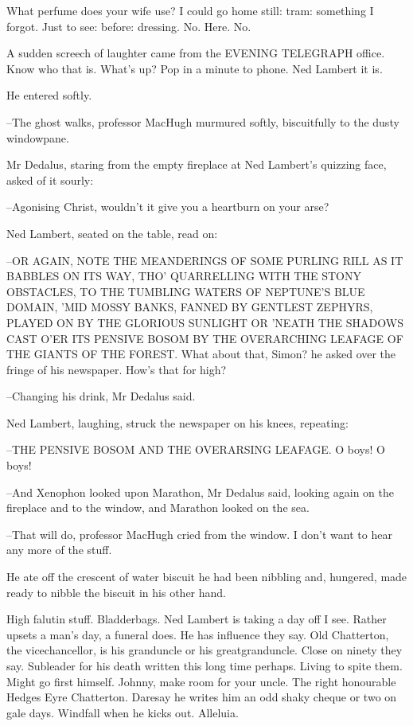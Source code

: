 What perfume does your wife use?
I could go home still:
tram: something I forgot.
Just to see: before:
dressing.
No.
Here.
No.

A sudden screech of laughter came from the EVENING TELEGRAPH office.
Know who that is.
What's up?
Pop in a minute to phone.
Ned Lambert it is.

He entered softly.



--The ghost walks,
professor MacHugh murmured softly, biscuitfully
to the dusty windowpane.

Mr Dedalus,
staring from the empty fireplace at Ned Lambert's quizzing face,
asked of it sourly:

--Agonising Christ,
wouldn't it give you a heartburn on your arse?

Ned Lambert, seated on the table, read on:

--OR AGAIN, NOTE THE MEANDERINGS OF SOME PURLING RILL
AS IT BABBLES ON ITS WAY,
THO' QUARRELLING WITH THE STONY OBSTACLES,
TO THE TUMBLING WATERS OF NEPTUNE'S BLUE DOMAIN,
'MID MOSSY BANKS,
FANNED BY GENTLEST ZEPHYRS,
PLAYED ON BY THE GLORIOUS SUNLIGHT
OR 'NEATH THE SHADOWS CAST O'ER ITS PENSIVE BOSOM
BY THE OVERARCHING LEAFAGE OF THE GIANTS OF THE FOREST.
What about that, Simon?
he asked over the fringe of his newspaper.
How's that for high?

--Changing his drink,
Mr Dedalus said.

Ned Lambert, laughing,
struck the newspaper on his knees,
repeating:

--THE PENSIVE BOSOM AND THE OVERARSING LEAFAGE.
O boys!
O boys!

--And Xenophon looked upon Marathon,
Mr Dedalus said,
looking again on the fireplace and to the window,
and Marathon looked on the sea.

--That will do,
professor MacHugh cried from the window.
I don't want to hear any more of the stuff.

He ate off the crescent of water biscuit
he had been nibbling and,
hungered,
made ready to nibble the biscuit in his other hand.

High falutin stuff.
Bladderbags.
Ned Lambert is taking a day off I see.
Rather upsets a man's day, a funeral does.
He has influence they say.
Old Chatterton, the vicechancellor, is his granduncle or his greatgranduncle.
Close on ninety they say.
Subleader for his death written this long time perhaps.
Living to spite them.
Might go first himself.
Johnny, make room for your uncle.
The right honourable Hedges Eyre Chatterton.
Daresay he writes him an odd shaky cheque or two on gale days.
Windfall when he kicks out. Alleluia.

